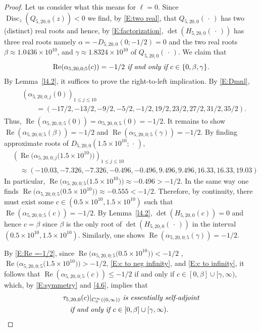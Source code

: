 \documentclass[reqno,11pt,centertags]{amsart}
\newcommand{\<}{\langle}
\renewcommand{\>}{\rangle}
\newcommand{\no}{\nonumber}
\newcommand{\lb}{\label}
\newcommand{\dott}{\,\cdot\,}
\renewcommand{\Re}{\operatorname{Re}}
\numberwithin{equation}{section}
\theoremstyle{definition}
\begin{document}
\begin{proof}
Let us consider what this means for $\ell=0$. Since $\operatorname{Disc}_z( Q_{5,20,0}(z))<0$ we find, by \eqref{E:two real}, that $Q_{5,20,0}(\dott)$ has two (distinct) real roots and hence,
by \eqref{E:factorization}, $\det (H_{5,20,0}(\dott))$ 
has three real roots namely  $\alpha=-D_{5,20,0}(0; -1/2)=0$ and the two real  roots $\beta  \approx 1.0436\times 10^{10}$, and $\gamma \approx 1.8324 \times 10^{10}$ of    $Q_{5,20,0}(\dott)$.
We claim that 
\begin{equation}\lb{E:Re =-1/2}
\mbox{\it $\Re(\alpha_{5,20,0;5}(c)) = -1/2$ if and only if $c\in \{0,\beta,\gamma\}$.}
\end{equation}
By Lemma~\ref{l4.2}, it suffices to prove the right-to-left implication. %
By \eqref{E:Dmnl},  
\begin{align}
\begin{split}
&\left(\alpha_{5,20,0;j}(0)\right)_{1\leq j\leq 10}  \\
&\qquad=(-17/2,-13/2,-9/2,-5/2,-1/2,19/2,23/2,27/2,31/2,35/2).
\end{split}
\end{align}
Thus, $\Re(\alpha_{5,20,0;5}(0)) = \alpha_{5,20,0;5}(0)=-1/2.$
It remains to show $\Re(\alpha_{5,20,0;5}(\beta)) = -1/2$ and $\Re(\alpha_{5,20,0;5}(\gamma)) = -1/2$.
By finding approximate roots of $D_{5,20,0}(1.5\times 10^{10}; \dott)$,   
%
\begin{align}
&\left(\Re\big(\alpha_{5,20,0;j}\big(1.5\times 10^{10}\big)\big)\right)_{1\leq j\leq 10}  \\
&\quad\approx(-10.03,-7.326,-7.326,-0.496,-0.496,9.496,9.496,16.33,16.33,19.03)\no 
\end{align}
%
In particular, $\Re\big(\alpha_{5,20,0;5}\big(1.5\times 10^{10}\big)\big)\approx -0.496 >-1/2$. In the same way one finds 
 $\Re\big(\alpha_{5,20,0;5}\big(0.5\times 10^{10}\big)\big)\approx -0.555 <-1/2$.
Therefore, by continuity, there must exist some $c\in (0.5\times 10^{10},1.5\times 10^{10})$ such that $\Re(\alpha_{5,20,0;5}(c)) = -1/2$. By Lemma~\ref{l4.2}, $\det (H_{5,20,0}(c))=0$ and hence $c=\beta$ since
$\beta$ is the only root of  $\det (H_{5,20,0}(\dott))$ in the interval $(0.5\times 10^{10},1.5\times 10^{10})$.
Similarly, one shows $\Re(\alpha_{5,20,0;5}(\gamma)) = -1/2$.

By \eqref{E:Re =-1/2},  since $\Re\big(\alpha_{5,20,0;5}\big(0.5\times 10^{10}\big)\big)< -1/2$ ,  $\Re\big(\alpha_{5,20,0;5}\big(1.5\times 10^{10}\big)\big) > -1/2$,  \eqref{E:c to neg infinity}, and \eqref{E:c to infinity}, 
it follows that $\Re(\alpha_{5,20,0;5}(c)) \leq -1/2$ if and only if $c \in [0,\beta] \cup [\gamma,\infty)$,
which, by \eqref{E:symmetry} and \eqref{4.6}, implies that 
%
\begin{align}\lb{E:tau5 ell=0}
\begin{split} 
& \mbox{\it $\tau_{5,20,0}(c)|_{C_0^{\infty}((0,\infty))}$ is essentially self-adjoint}\\
&  \quad \text{\it  if and only if $c \in [0,\beta] \cup [\gamma,\infty).$} \\
\end{split} 
\end{align}
 

\end{proof}
\end{document}
